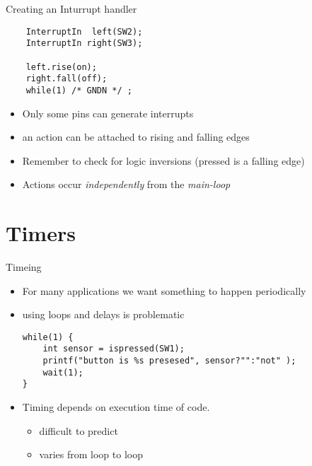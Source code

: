 \documentclass[xcolor=svgnames]{beamer}
\begin{document}
\begin{frame}[fragile]{Creating an Inturrupt handler}
\begin{exampleblock}{}
\begin{verbatim}
    InterruptIn  left(SW2);
    InterruptIn right(SW3);

    left.rise(on);
    right.fall(off);
    while(1) /* GNDN */ ;
\end{verbatim}
\end{exampleblock}
\begin{itemize}
\item Only some pins can generate interrupts
\item an action can be attached to rising and falling edges
\item \alert{Remember} to check for logic inversions (pressed is a falling edge)
\item Actions occur \emph{independently} from the \emph{main-loop}
\end{itemize}
\end{frame}

\part{Timers}
\frame\partpage


\begin{frame}[fragile]{Timeing }
\begin{itemize}
\item For many applications we want something to happen periodically
\item using loops and delays is problematic
\begin{verbatim}
while(1) {
    int sensor = ispressed(SW1);
    printf("button is %s presesed", sensor?"":"not" );
    wait(1);
}
\end{verbatim}
\item Timing depends on execution time of code.
\begin{itemize}
\item difficult to predict
\item varies from loop to loop
\end{itemize}
\end{itemize}
\end{frame}
\end{document}
